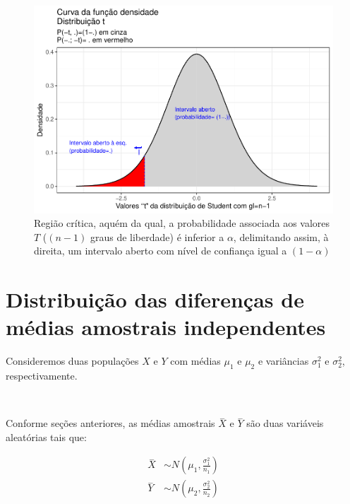 \documentclass[
]{book}
\begin{document}
\begin{figure}

{\centering \includegraphics[width=1\linewidth]{apostila_files/figure-latex/fig60-1} 

}

\caption{Região crítica, aquém da qual, a probabilidade associada aos valores $T$ ($(n-1)$ graus de liberdade)  é inferior a $\alpha$, delimitando assim, à direita, um intervalo aberto com nível de confiança igual a $(1-\alpha)$}\label{fig:fig60}
\end{figure}

\hypertarget{distribuiuxe7uxe3o-das-diferenuxe7as-de-muxe9dias-amostrais-independentes}{%
\section{Distribuição das diferenças de médias amostrais independentes}\label{distribuiuxe7uxe3o-das-diferenuxe7as-de-muxe9dias-amostrais-independentes}}

Consideremos duas populações \(X\) e \(Y\) com médias \(\mu_{1}\) e \(\mu_{2}\) e variâncias \(\sigma_{1}^{2}\) e \(\sigma_{2}^{2}\), respectivamente.

~

Conforme seções anteriores, as médias amostrais \(\stackrel{-}{X}\) e \(\stackrel{-}{Y}\) são duas variáveis aleatórias tais que:

\hfill\break

\begin{align*}
\stackrel{-}{X} &  \sim N(\mu_{1},  \frac{\sigma^{2}_{1}}{n_{1}} )\\
\stackrel{-}{Y} & \sim N(\mu_{2},  \frac{\sigma^{2}_{2}}{n_{2}} )
\end{align*}
\end{document}
